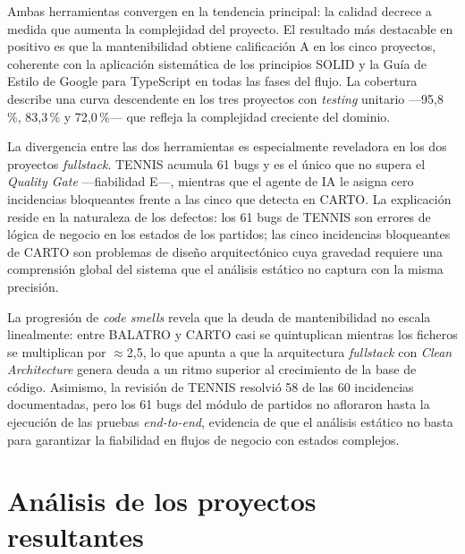 Ambas herramientas convergen en la tendencia principal: la calidad decrece a medida que aumenta la complejidad del proyecto. El resultado más destacable en positivo es que la mantenibilidad obtiene calificación A en los cinco proyectos, coherente con la aplicación sistemática de los principios \ac{SOLID} y la Guía de Estilo de Google para TypeScript en todas las fases del flujo. La cobertura describe una curva descendente en los tres proyectos con \textit{testing} unitario ---95{,}8\,\%, 83{,}3\,\% y 72{,}0\,\%--- que refleja la complejidad creciente del dominio.

La divergencia entre las dos herramientas es especialmente reveladora en los dos proyectos \textit{fullstack}. \ac{TENNIS} acumula 61 bugs y es el único que no supera el \textit{Quality Gate} ---fiabilidad E---, mientras que el agente de \ac{IA} le asigna cero incidencias bloqueantes frente a las cinco que detecta en \ac{CARTO}. La explicación reside en la naturaleza de los defectos: los 61 bugs de \ac{TENNIS} son errores de lógica de negocio en los estados de los partidos; las cinco incidencias bloqueantes de \ac{CARTO} son problemas de diseño arquitectónico cuya gravedad requiere una comprensión global del sistema que el análisis estático no captura con la misma precisión.

La progresión de \textit{code smells} revela que la deuda de mantenibilidad no escala linealmente: entre \ac{BALATRO} y \ac{CARTO} casi se quintuplican mientras los ficheros se multiplican por $\approx$2{,}5, lo que apunta a que la arquitectura \textit{fullstack} con \textit{Clean Architecture} genera deuda a un ritmo superior al crecimiento de la base de código. Asimismo, la revisión de \ac{TENNIS} resolvió 58 de las 60 incidencias documentadas, pero los 61 bugs del módulo de partidos no afloraron hasta la ejecución de las pruebas \textit{end-to-end}, evidencia de que el análisis estático no basta para garantizar la fiabilidad en flujos de negocio con estados complejos.

\section{Análisis de los proyectos resultantes} \label{sec:results-analysis}

